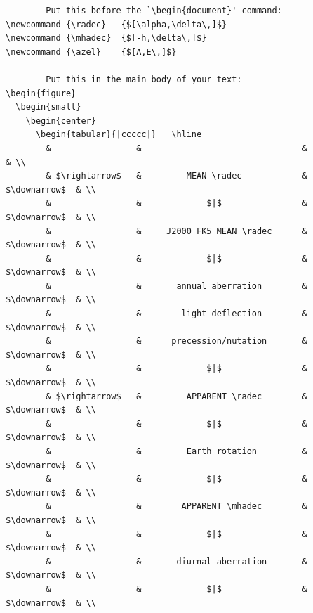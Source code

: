 \documentclass[11pt,twoside]{article}
\newcommand {\radec}   {$[\alpha,\delta\,]$}
\newcommand {\mhadec}  {$[-h,\delta\,]$}
\newcommand {\azel}    {$[A,E\,]$}
\begin{document}
{\scriptsize
\begin{verbatim}
        Put this before the `\begin{document}' command:
\newcommand {\radec}   {$[\alpha,\delta\,]$}
\newcommand {\mhadec}  {$[-h,\delta\,]$}
\newcommand {\azel}    {$[A,E\,]$}

        Put this in the main body of your text:
\begin{figure}
  \begin{small}
    \begin{center}
      \begin{tabular}{|ccccc|}   \hline
        &                 &                                &                & \\
        & $\rightarrow$   &         MEAN \radec            &  $\downarrow$  & \\
        &                 &             $|$                &  $\downarrow$  & \\
        &                 &     J2000 FK5 MEAN \radec      &  $\downarrow$  & \\
        &                 &             $|$                &  $\downarrow$  & \\
        &                 &       annual aberration        &  $\downarrow$  & \\
        &                 &        light deflection        &  $\downarrow$  & \\
        &                 &      precession/nutation       &  $\downarrow$  & \\
        &                 &             $|$                &  $\downarrow$  & \\
        & $\rightarrow$   &         APPARENT \radec        &  $\downarrow$  & \\
        &                 &             $|$                &  $\downarrow$  & \\
        &                 &         Earth rotation         &  $\downarrow$  & \\
        &                 &             $|$                &  $\downarrow$  & \\
        &                 &        APPARENT \mhadec        &  $\downarrow$  & \\
        &                 &             $|$                &  $\downarrow$  & \\
        &                 &       diurnal aberration       &  $\downarrow$  & \\
        &                 &             $|$                &  $\downarrow$  & \\

\end{verbatim}}
\end{document}
